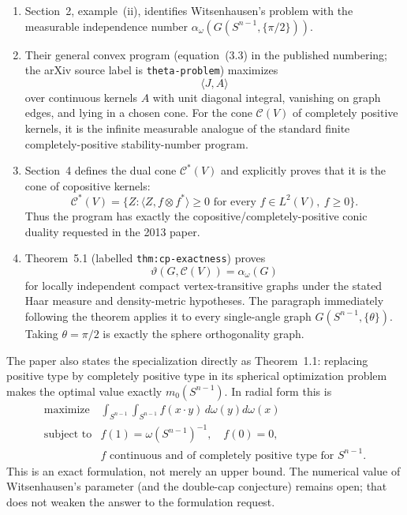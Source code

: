 \documentclass[11pt]{article}
\newcommand{\Sph}{S^{n-1}}
\begin{document}
\begin{enumerate}
\item Section~2, example~(ii), identifies Witsenhausen's problem with the
measurable independence number $\alpha_\omega(G(\Sph,\{\pi/2\}))$.

\item Their general convex program (equation~(3.3) in the published numbering;
the arXiv source label is \texttt{theta-problem}) maximizes
\[
 \langle J,A\rangle
\]
over continuous kernels $A$ with unit diagonal integral, vanishing on graph
edges, and lying in a chosen cone.  For the cone $\mathcal C(V)$ of completely
positive kernels, it is the infinite measurable analogue of the standard
finite completely-positive stability-number program.

\item Section~4 defines the dual cone $\mathcal C^*(V)$ and explicitly proves
that it is the cone of copositive kernels:
\[
 \mathcal C^*(V)=\{Z:\langle Z,f\otimes f^*\rangle\ge0
 \text{ for every }f\in L^2(V),\ f\ge0\}.
\]
Thus the program has exactly the copositive/completely-positive conic duality
requested in the 2013 paper.

\item Theorem~5.1 (labelled \texttt{thm:cp-exactness}) proves
\[
 \vartheta(G,\mathcal C(V))=\alpha_\omega(G)
\]
for locally independent compact vertex-transitive graphs under the stated Haar
measure and density-metric hypotheses.  The paragraph immediately following
the theorem applies it to every single-angle graph
$G(\Sph,\{\theta\})$.  Taking $\theta=\pi/2$ is exactly the sphere
orthogonality graph.
\end{enumerate}

The paper also states the specialization directly as Theorem~1.1: replacing
positive type by completely positive type in its spherical optimization
problem makes the optimal value exactly $m_0(\Sph)$.  In radial form this is
\begin{equation*}
\begin{array}{rl}
\text{maximize}&\displaystyle
 \int_{\Sph}\int_{\Sph} f(x\cdot y)\,d\omega(y)d\omega(x)\\[1ex]
\text{subject to}&f(1)=\omega(\Sph)^{-1},\quad f(0)=0,\\
&f\text{ continuous and of completely positive type for }\Sph.
\end{array}
\end{equation*}
This is an exact formulation, not merely an upper bound.  The numerical value
of Witsenhausen's parameter (and the double-cap conjecture) remains open; that
does not weaken the answer to the formulation request.
\end{document}
